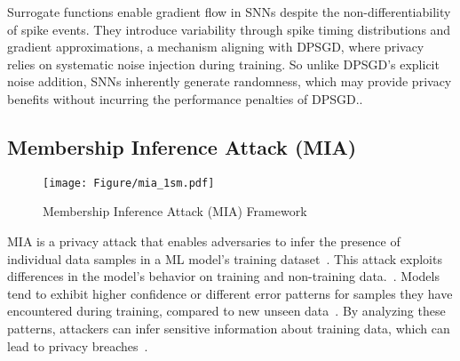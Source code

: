 Surrogate functions enable gradient flow in SNNs despite the non-differentiability of spike events. They introduce variability through spike timing distributions and gradient approximations, a mechanism aligning with DPSGD, where privacy relies on systematic noise injection during training. So unlike DPSGD’s explicit noise addition, SNNs   inherently generate randomness, which may provide privacy benefits without incurring the performance penalties of DPSGD..









\subsection{Membership Inference Attack (MIA)}


\begin{figure}[ht!]
    \centering
    \texttt{[image: Figure/mia\_1sm.pdf]}
    \caption{Membership Inference Attack (MIA) Framework}
    \label{fig:mia_24}
\end{figure}
\noindent  
MIA is a privacy attack that enables adversaries to infer the presence of individual data samples in a ML model's training dataset~\cite{shokri}. This attack exploits differences in the model's behavior on training and non-training data.~\cite{rahman2018membership}. Models tend to exhibit higher confidence or different error patterns for samples they have encountered during training, compared to new unseen data~\cite{nguyen2015deep}. By analyzing these patterns, attackers can infer sensitive information about training data, which can lead to privacy breaches~\cite{de2020overview}.

